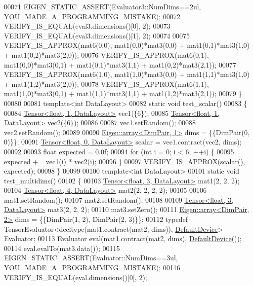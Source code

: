 \begin{DoxyCode}
00071   EIGEN\_STATIC\_ASSERT(Evaluator3::NumDims==2ul, YOU\_MADE\_A\_PROGRAMMING\_MISTAKE);
00072   VERIFY\_IS\_EQUAL(eval3.dimensions()[0], 2);
00073   VERIFY\_IS\_EQUAL(eval3.dimensions()[1], 2);
00074 
00075   VERIFY\_IS\_APPROX(mat6(0,0), mat1(0,0)*mat3(0,0) + mat1(0,1)*mat3(1,0) + mat1(0,2)*mat3(2,0));
00076   VERIFY\_IS\_APPROX(mat6(0,1), mat1(0,0)*mat3(0,1) + mat1(0,1)*mat3(1,1) + mat1(0,2)*mat3(2,1));
00077   VERIFY\_IS\_APPROX(mat6(1,0), mat1(1,0)*mat3(0,0) + mat1(1,1)*mat3(1,0) + mat1(1,2)*mat3(2,0));
00078   VERIFY\_IS\_APPROX(mat6(1,1), mat1(1,0)*mat3(0,1) + mat1(1,1)*mat3(1,1) + mat1(1,2)*mat3(2,1));
00079 \}
00080 
00081 \textcolor{keyword}{template}<\textcolor{keywordtype}{int} DataLayout>
00082 \textcolor{keyword}{static} \textcolor{keywordtype}{void} test\_scalar()
00083 \{
00084   \hyperlink{class_eigen_1_1_tensor}{Tensor<float, 1, DataLayout>} vec1(\{6\});
00085   \hyperlink{class_eigen_1_1_tensor}{Tensor<float, 1, DataLayout>} vec2(\{6\});
00086 
00087   vec1.setRandom();
00088   vec2.setRandom();
00089 
00090   \hyperlink{class_eigen_1_1array}{Eigen::array<DimPair, 1>} dims = \{\{DimPair(0, 0)\}\};
00091   \hyperlink{class_eigen_1_1_tensor}{Tensor<float, 0, DataLayout>} scalar = vec1.contract(vec2, dims);
00092 
00093   \textcolor{keywordtype}{float} expected = 0.0f;
00094   \textcolor{keywordflow}{for} (\textcolor{keywordtype}{int} i = 0; i < 6; ++i) \{
00095     expected += vec1(i) * vec2(i);
00096   \}
00097   VERIFY\_IS\_APPROX(scalar(), expected);
00098 \}
00099 
00100 \textcolor{keyword}{template}<\textcolor{keywordtype}{int} DataLayout>
00101 \textcolor{keyword}{static} \textcolor{keywordtype}{void} test\_multidims()
00102 \{
00103   \hyperlink{class_eigen_1_1_tensor}{Tensor<float, 3, DataLayout>} mat1(2, 2, 2);
00104   \hyperlink{class_eigen_1_1_tensor}{Tensor<float, 4, DataLayout>} mat2(2, 2, 2, 2);
00105 
00106   mat1.setRandom();
00107   mat2.setRandom();
00108 
00109   \hyperlink{class_eigen_1_1_tensor}{Tensor<float, 3, DataLayout>} mat3(2, 2, 2);
00110   mat3.setZero();
00111   \hyperlink{class_eigen_1_1array}{Eigen::array<DimPair, 2>} dims = \{\{DimPair(1, 2), DimPair(2, 3)\}\};
00112   \textcolor{keyword}{typedef} TensorEvaluator<decltype(mat1.contract(mat2, dims)), \hyperlink{struct_eigen_1_1_default_device}{DefaultDevice}> Evaluator;
00113   Evaluator eval(mat1.contract(mat2, dims), \hyperlink{struct_eigen_1_1_default_device}{DefaultDevice}());
00114   eval.evalTo(mat3.data());
00115   EIGEN\_STATIC\_ASSERT(Evaluator::NumDims==3ul, YOU\_MADE\_A\_PROGRAMMING\_MISTAKE);
00116   VERIFY\_IS\_EQUAL(eval.dimensions()[0], 2);

\end{DoxyCode}
